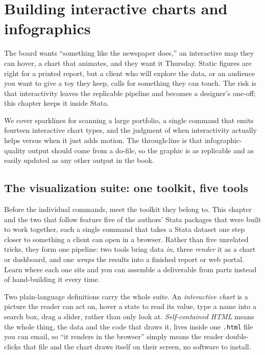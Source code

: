 \documentclass[
    a4paper,
    fontsize=10pt,
    twoside=true,
    numbers=noenddot,
]{kaobook}
\begin{document}
\chapter{Building interactive charts and infographics}\label{ch:interactive}

The board wants \enquote{something like the newspaper does,} an interactive map they can hover, a chart that animates, and they want it Thursday. Static figures are right for a printed report, but a client who will explore the data, or an audience you want to give a toy they keep, calls for something they can touch. The risk is that interactivity leaves the replicable pipeline and becomes a designer's one-off; this chapter keeps it inside Stata.

We cover sparklines for scanning a large portfolio, a single command that emits fourteen interactive chart types, and the judgment of when interactivity actually helps versus when it just adds motion. The through-line is that infographic-quality output should come from a do-file, so the graphic is as replicable and as easily updated as any other output in the book.

\section{The visualization suite: one toolkit, five tools}\label{sec:suite}
Before the individual commands, meet the toolkit they belong to. This chapter and the two that follow feature five of the authors' Stata packages that were built to work together, each a single command that takes a Stata dataset one step closer to something a client can open in a browser. Rather than five unrelated tricks, they form one pipeline: two tools bring data \emph{in}, three \emph{render} it as a chart or dashboard, and one \emph{wraps} the results into a finished report or web portal. Learn where each one sits and you can assemble a deliverable from parts instead of hand-building it every time.

Two plain-language definitions carry the whole suite. An \emph{interactive chart} is a picture the reader can act on, hover a state to read its value, type a name into a search box, drag a slider, rather than only look at. \emph{Self-contained HTML} means the whole thing, the data and the code that draws it, lives inside one \texttt{.html} file you can email, so \enquote{it renders in the browser} simply means the reader double-clicks that file and the chart draws itself on their screen, no software to install.
\end{document}

